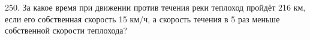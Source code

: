 250. За какое время при движении против течения реки теплоход пройдёт 216 км, если его собственная скорость 15 км/ч, а скорость течения в 5 раз меньше собственной скорости теплохода?\\
